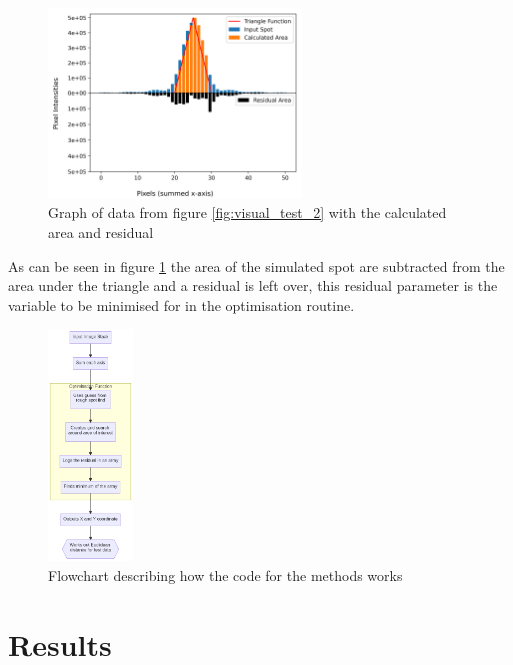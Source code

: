 \documentclass[aps,pra,a4paper,nofootinbib,onecolumn,tightenlines,longbibliography,12pt,amsfonts,amssymb,amsmath,floatfix]{revtex4-2} %
\begin{document}
    \begin{figure}[H]
      \begin{center}
        \includegraphics[width=0.6\textwidth]{project_pics/visual_test.png}
      \end{center}
      \caption{Graph of data from figure \ref{fig:visual_test_2} with the calculated area and residual}
      \label{fig:visual_test}
    \end{figure}
    
    As can be seen in figure \ref{fig:visual_test} the area of the simulated spot are subtracted from 
    the area under the triangle and a residual is left over, this residual parameter is the 
    variable to be minimised for in the optimisation routine.

    \begin{figure}[h]
      \begin{center}
        \includegraphics[width=0.2\textwidth]{project_pics/flowchart.png}
      \end{center}
      \caption{Flowchart describing how the code for the methods works}
      \label{fig:flowchart}
    \end{figure}
    
    
    

\section{Results} %
\label{sec:Results}
\end{document}
